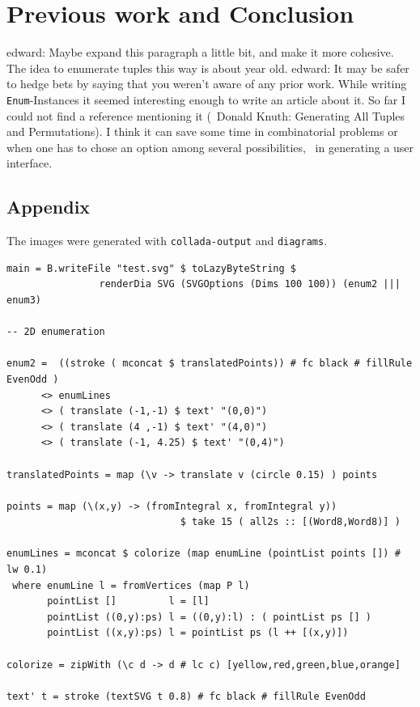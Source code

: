 \documentclass{tmr}
\newcommand{\authornote}[3]{{\color{#2} {\sc #1}: #3}}
\newcommand\bay[1]{\authornote{edward}{blue}{#1}}
\begin{document}
\section{Previous work and Conclusion}
\bay{Maybe expand this paragraph a little bit, and make it more cohesive.}
The idea to enumerate tuples this way is about year old. \bay{It may be safer to hedge bets by saying that you weren't aware of any prior work.} While writing \verb|Enum|-Instances it seemed interesting enough to write an article about it. So far I could not find a reference mentioning it (\eg\ Donald Knuth: Generating All Tuples and Permutations). I think it can save some time in combinatorial problems or when one has to chose an option among several possibilities, \eg\ in generating a user interface.

\subsection{Appendix}

The images were generated with \verb|collada-output| and \verb|diagrams|.

\begin{verbatim}
main = B.writeFile "test.svg" $ toLazyByteString $
                renderDia SVG (SVGOptions (Dims 100 100)) (enum2 ||| enum3)

-- 2D enumeration

enum2 =  ((stroke ( mconcat $ translatedPoints)) # fc black # fillRule EvenOdd )
      <> enumLines
      <> ( translate (-1,-1) $ text' "(0,0)")
      <> ( translate (4 ,-1) $ text' "(4,0)")
      <> ( translate (-1, 4.25) $ text' "(0,4)")

translatedPoints = map (\v -> translate v (circle 0.15) ) points

points = map (\(x,y) -> (fromIntegral x, fromIntegral y))
                              $ take 15 ( all2s :: [(Word8,Word8)] )

enumLines = mconcat $ colorize (map enumLine (pointList points []) # lw 0.1)
 where enumLine l = fromVertices (map P l)
       pointList []         l = [l]
       pointList ((0,y):ps) l = ((0,y):l) : ( pointList ps [] )
       pointList ((x,y):ps) l = pointList ps (l ++ [(x,y)])

colorize = zipWith (\c d -> d # lc c) [yellow,red,green,blue,orange]

text' t = stroke (textSVG t 0.8) # fc black # fillRule EvenOdd
\end{verbatim}
\end{document}
